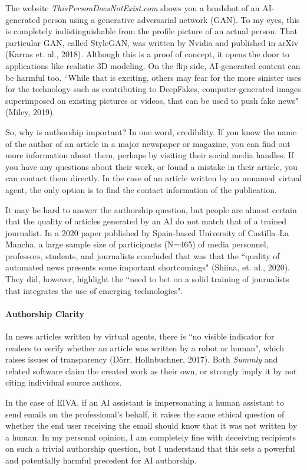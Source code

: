 \documentclass{article}
\begin{document}
The website \emph{ThisPersonDoesNotExist.com} shows you a headshot of an AI-generated person using a generative adversarial network (GAN). To my eyes, this is completely indistinguishable from the profile picture of an actual person. That particular GAN, called StyleGAN, was written by Nvidia and published in arXiv (Karras et. al., 2018). Although this is a proof of concept, it opens the door to applications like realistic 3D modeling. On the flip side, AI-generated content can be harmful too. ``While that is exciting, others may fear for the more sinister uses for the technology such as contributing to DeepFakes, computer-generated images superimposed on existing pictures or videos, that can be used to push fake news" (Miley, 2019).

So, why is authorship important? In one word, credibility. If you know the name of the author of an article in a major newspaper or magazine, you can find out more information about them, perhaps by visiting their social media handles. If you have any questions about their work, or found a mistake in their article, you can contact them directly. In the case of an article written by an unnamed virtual agent, the only option is to find the contact information of the publication.

It may be hard to answer the authorship question, but people are almost certain that the quality of articles generated by an AI do not match that of a trained journalist. In a 2020 paper published by Spain-based University of Castilla–La Mancha, a large sample size of participants (N=465) of media personnel, professors, students, and journalists concluded that was that the ``quality of automated news presents some important shortcomings" (Shiina, et. al., 2020). They did, however, highlight the ``need to bet on a solid training of journalists that integrates the use of emerging technologies".

\paragraph{Authorship Clarity}

In news articles written by virtual agents, there is ``no visible indicator for readers to verify whether an article was written by a robot or human", which raises issues of transparency (Dörr, Hollnbuchner, 2017). Both \emph{Summly} and related software claim the created work as their own, or strongly imply it by not citing individual source authors.

In the case of EIVA, if an AI assistant is impersonating a human assistant to send emails on the professional's behalf, it raises the same ethical question of whether the end user receiving the email should know that it was not written by a human. In my personal opinion, I am completely fine with deceiving recipients on such a trivial authorship question, but I understand that this sets a powerful and potentially harmful precedent for AI authorship.
\end{document}
